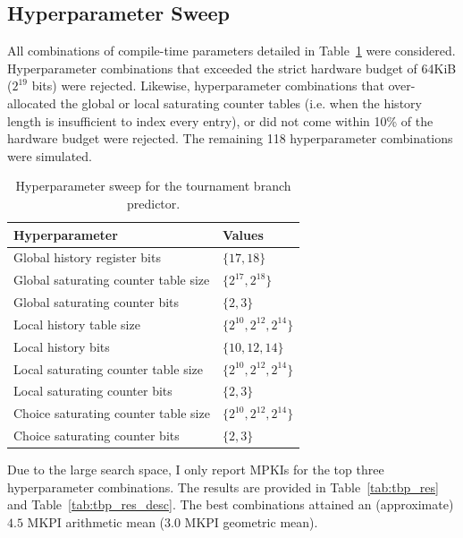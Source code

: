 \documentclass{article}
\begin{document}
\subsection{Hyperparameter Sweep}
\label{sec:tbp_hp}

All combinations of compile-time parameters detailed in Table~\ref{tab:tbp_hp} were considered. Hyperparameter combinations that exceeded the strict hardware 
budget of 64KiB ($2^{19}$ bits) were rejected. Likewise, hyperparameter combinations that over-allocated the global or local saturating counter tables (i.e. 
when the history length is insufficient to index every entry), or did not come within 10\% of the hardware budget were rejected. The remaining 118 
hyperparameter combinations were simulated. 

\begin{table}[h]
    \centering
    \begin{tabular}{ll}
        \toprule
        \textbf{Hyperparameter} & \textbf{Values} \\
        \midrule
        Global history register bits       & $\{17, 18\}$ \\
        Global saturating counter table size & $\{2^{17}, 2^{18}\}$ \\
        Global saturating counter bits     & $\{2, 3\}$ \\
        Local history table size           & $\{2^{10}, 2^{12}, 2^{14}\}$ \\
        Local history bits                 & $\{10, 12, 14\}$ \\
        Local saturating counter table size & $\{2^{10}, 2^{12}, 2^{14}\}$ \\
        Local saturating counter bits      & $\{2, 3\}$ \\
        Choice saturating counter table size & $\{2^{10}, 2^{12}, 2^{14}\}$ \\
        Choice saturating counter bits     & $\{2, 3\}$ \\
        \bottomrule
    \end{tabular}
    \caption{Hyperparameter sweep for the tournament branch predictor.}
    \label{tab:tbp_hp}
\end{table}

\noindent
Due to the large search space, I only report MPKIs for the top three hyperparameter combinations. The results are provided in Table~\ref{tab:tbp_res} and 
Table~\ref{tab:tbp_res_desc}. The best combinations attained an (approximate) $4.5$ MKPI arithmetic mean ($3.0$ MKPI geometric mean).
\end{document}

